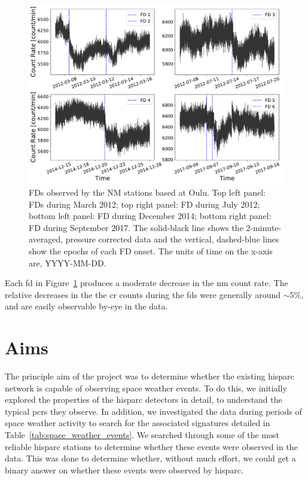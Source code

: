 \begin{figure}[ht!]
	\centering
	\includegraphics[width=0.75\columnwidth]{FDs_OULU.pdf}
	\caption{FDs observed by the NM stations based at Oulu. Top left panel: FDs during March 2012; top right panel: FD during July 2012; bottom left panel: FD during December 2014; bottom right panel: FD during September 2017. The solid-black line shows the 2-minute-averaged, pressure corrected data and the vertical, dashed-blue lines show the epochs of each FD onset. The units of time on the x-axis are, YYYY-MM-DD.}
	\label{fig:oulu_fds}
\end{figure}


Each \gls{fd} in Figure~\ref{fig:oulu_fds} produces a moderate decrease in the \gls{nm} count rate. The relative decreases in the the \gls{cr} counts during the \glspl{fd} were generally around $\sim 5\%$, and are easily observable by-eye in the data.





\section{Aims}\label{sec:HS_aims}


The principle aim of the project was to determine whether the existing \gls{hisparc} network is capable of observing space weather events. To do this, we initially explored the properties of the \gls{hisparc} detectors in detail, to understand the typical \glspl{pcr} they observe. In addition, we investigated the data during periods of space weather activity to search for the associated signatures detailed in Table~\ref{tab:space_weather_events}. We searched through some of the most reliable \gls{hisparc} stations to determine whether these events were observed in the data. This was done to determine whether, without much effort, we could get a binary answer on whether these events were observed by \gls{hisparc}.

